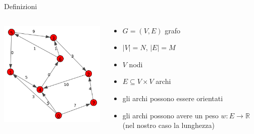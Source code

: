 \documentclass{beamer}
\theoremstyle{plain}
\theoremstyle{definition}
\theoremstyle{remark}
\newcommand{\abs}[1]{\left|#1\right|}
\begin{document}
\begin{frame}{Definizioni}
  \begin{columns}
    \begin{column}{0.40\textwidth}
      \includegraphics[width=\textwidth]{directgraph}
    \end{column}
    \begin{column}{0.58\textwidth}
      \begin{itemize}
      \item $G = (V,E)$ grafo
      \item $\abs{V} = N$, $\abs{E} = M$
      \item $V$ nodi
      \item $E \subseteq V\times V$ archi
      \item gli archi possono essere orientati
      \item gli archi possono avere un peso $w: E \to \mathbb{R}$ (nel
        nostro caso la lunghezza)
      \end{itemize}
    \end{column}
  \end{columns}
\end{frame}
\end{document}
